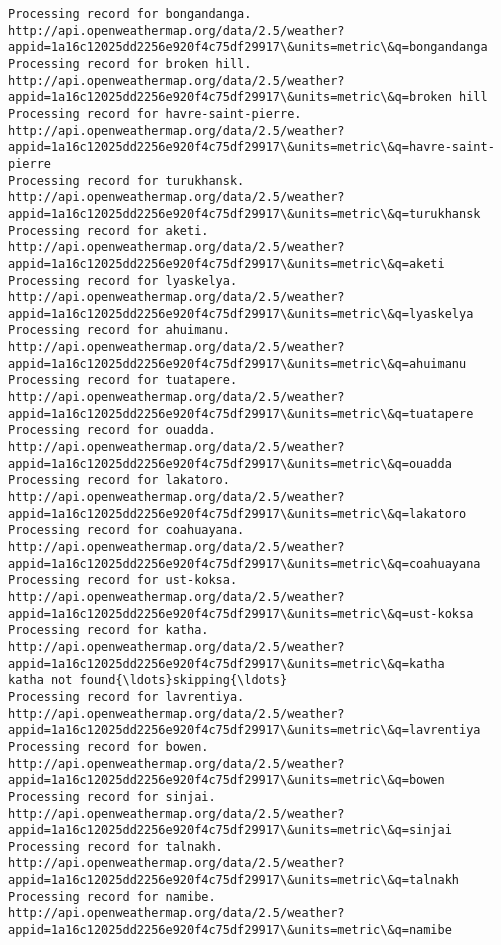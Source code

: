 \documentclass[11pt]{article}
\begin{document}
\begin{Verbatim}[commandchars=\\\{\}]
Processing record for bongandanga.
http://api.openweathermap.org/data/2.5/weather?appid=1a16c12025dd2256e920f4c75df29917\&units=metric\&q=bongandanga
Processing record for broken hill.
http://api.openweathermap.org/data/2.5/weather?appid=1a16c12025dd2256e920f4c75df29917\&units=metric\&q=broken hill
Processing record for havre-saint-pierre.
http://api.openweathermap.org/data/2.5/weather?appid=1a16c12025dd2256e920f4c75df29917\&units=metric\&q=havre-saint-pierre
Processing record for turukhansk.
http://api.openweathermap.org/data/2.5/weather?appid=1a16c12025dd2256e920f4c75df29917\&units=metric\&q=turukhansk
Processing record for aketi.
http://api.openweathermap.org/data/2.5/weather?appid=1a16c12025dd2256e920f4c75df29917\&units=metric\&q=aketi
Processing record for lyaskelya.
http://api.openweathermap.org/data/2.5/weather?appid=1a16c12025dd2256e920f4c75df29917\&units=metric\&q=lyaskelya
Processing record for ahuimanu.
http://api.openweathermap.org/data/2.5/weather?appid=1a16c12025dd2256e920f4c75df29917\&units=metric\&q=ahuimanu
Processing record for tuatapere.
http://api.openweathermap.org/data/2.5/weather?appid=1a16c12025dd2256e920f4c75df29917\&units=metric\&q=tuatapere
Processing record for ouadda.
http://api.openweathermap.org/data/2.5/weather?appid=1a16c12025dd2256e920f4c75df29917\&units=metric\&q=ouadda
Processing record for lakatoro.
http://api.openweathermap.org/data/2.5/weather?appid=1a16c12025dd2256e920f4c75df29917\&units=metric\&q=lakatoro
Processing record for coahuayana.
http://api.openweathermap.org/data/2.5/weather?appid=1a16c12025dd2256e920f4c75df29917\&units=metric\&q=coahuayana
Processing record for ust-koksa.
http://api.openweathermap.org/data/2.5/weather?appid=1a16c12025dd2256e920f4c75df29917\&units=metric\&q=ust-koksa
Processing record for katha.
http://api.openweathermap.org/data/2.5/weather?appid=1a16c12025dd2256e920f4c75df29917\&units=metric\&q=katha
katha not found{\ldots}skipping{\ldots}
Processing record for lavrentiya.
http://api.openweathermap.org/data/2.5/weather?appid=1a16c12025dd2256e920f4c75df29917\&units=metric\&q=lavrentiya
Processing record for bowen.
http://api.openweathermap.org/data/2.5/weather?appid=1a16c12025dd2256e920f4c75df29917\&units=metric\&q=bowen
Processing record for sinjai.
http://api.openweathermap.org/data/2.5/weather?appid=1a16c12025dd2256e920f4c75df29917\&units=metric\&q=sinjai
Processing record for talnakh.
http://api.openweathermap.org/data/2.5/weather?appid=1a16c12025dd2256e920f4c75df29917\&units=metric\&q=talnakh
Processing record for namibe.
http://api.openweathermap.org/data/2.5/weather?appid=1a16c12025dd2256e920f4c75df29917\&units=metric\&q=namibe

\end{Verbatim}
\end{document}
